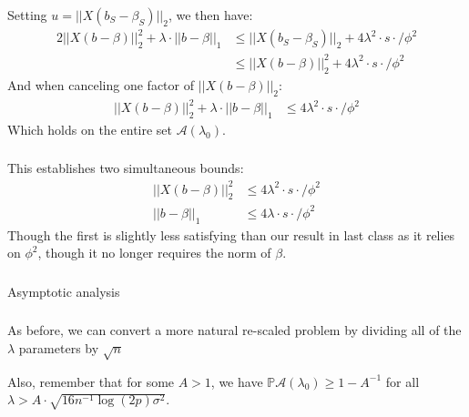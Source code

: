\begin{frame}[fragile] \frametitle{}

Setting $u = || X( b_S - \beta_S) ||_2$, we then have:
\begin{align*}
2 || X ( b - \beta) ||_2^2 + \lambda \cdot || b - \beta ||_1
  &\leq || X( b_S - \beta_S) ||_2 + 4 \lambda^2 \cdot s \cdot / \phi^2 \\
  &\leq || X( b - \beta) ||_2^2 + 4 \lambda^2 \cdot s \cdot / \phi^2
\end{align*}
\pause And when canceling one factor of $|| X( b - \beta) ||_2$:
\begin{align*}
|| X ( b - \beta) ||_2^2 + \lambda \cdot || b - \beta ||_1
  &\leq 4 \lambda^2 \cdot s \cdot / \phi^2
\end{align*}
Which holds on the entire set $\mathcal{A}(\lambda_0)$.

\end{frame}

\begin{frame}[fragile] \frametitle{}

This establishes two simultaneous bounds:
\begin{align*}
|| X ( b - \beta) ||_2^2 &\leq 4 \lambda^2 \cdot s \cdot / \phi^2 \\
|| b - \beta ||_1 &\leq 4 \lambda \cdot s \cdot / \phi^2
\end{align*}
Though the first is slightly less satisfying than our result
in last class as it relies on $\phi^2$, though it no longer requires
the norm of $\beta$.

\end{frame}

\begin{frame}[fragile] \frametitle{}

\begin{flushright}
{\color{yaleblue}\sc\fontsize{1cm}{0cm}\selectfont Asymptotic analysis}
\end{flushright}

\end{frame}

\begin{frame}[fragile] \frametitle{}

As before, we can convert a more natural re-scaled problem by dividing all of the
$\lambda$ parameters by $\sqrt{n}$

Also, remember that for some $A > 1$, we have $\mathbb{P} \mathcal{A}(\lambda_0) \geq 1 - A^{-1}$
for all $\lambda > A \cdot \sqrt{16 n^{-1} \log(2p) \sigma^2}$.

\end{frame}

